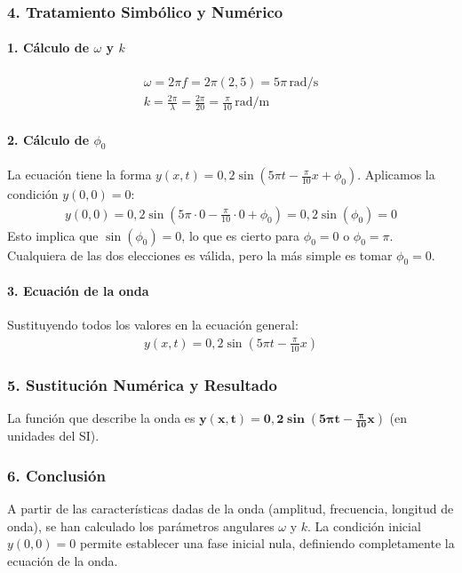 \subsubsection*{4. Tratamiento Simbólico y Numérico}
\paragraph{1. Cálculo de $\omega$ y $k$}
\begin{gather}
    \omega = 2\pi f = 2\pi (2,5) = 5\pi \, \text{rad/s} \\
    k = \frac{2\pi}{\lambda} = \frac{2\pi}{20} = \frac{\pi}{10} \, \text{rad/m}
\end{gather}

\paragraph{2. Cálculo de $\phi_0$}
La ecuación tiene la forma $y(x,t) = 0,2 \sin(5\pi t - \frac{\pi}{10}x + \phi_0)$.
Aplicamos la condición $y(0,0)=0$:
\begin{gather}
    y(0,0) = 0,2 \sin(5\pi \cdot 0 - \frac{\pi}{10} \cdot 0 + \phi_0) = 0,2 \sin(\phi_0) = 0
\end{gather}
Esto implica que $\sin(\phi_0) = 0$, lo que es cierto para $\phi_0 = 0$ o $\phi_0 = \pi$. Cualquiera de las dos elecciones es válida, pero la más simple es tomar $\phi_0 = 0$.

\paragraph{3. Ecuación de la onda}
Sustituyendo todos los valores en la ecuación general:
\begin{gather}
    y(x,t) = 0,2 \sin\left(5\pi t - \frac{\pi}{10}x\right)
\end{gather}

\subsubsection*{5. Sustitución Numérica y Resultado}
\begin{cajaresultado}
La función que describe la onda es $\boldsymbol{y(x,t) = 0,2 \sin\left(5\pi t - \frac{\pi}{10}x\right)}$ (en unidades del SI).
\end{cajaresultado}

\subsubsection*{6. Conclusión}
\begin{cajaconclusion}
A partir de las características dadas de la onda (amplitud, frecuencia, longitud de onda), se han calculado los parámetros angulares $\omega$ y $k$. La condición inicial $y(0,0)=0$ permite establecer una fase inicial nula, definiendo completamente la ecuación de la onda.
\end{cajaconclusion}

